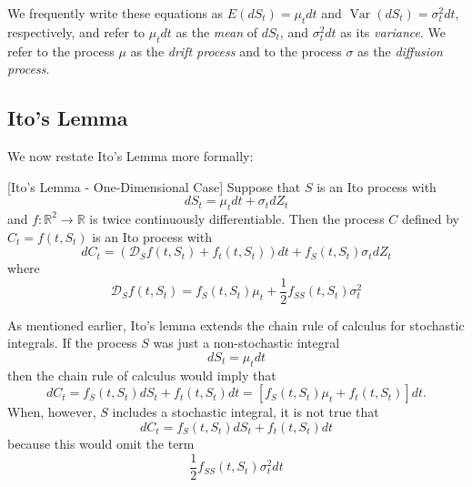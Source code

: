 \documentclass[\topdir/lecture\_notes.tex]{subfiles}
\begin{document}
We frequently write these equations as \(E(dS_{t})=\mu_{t} dt\) and \(\operatorname{Var}(dS_{t})=\sigma_{t}^{2} dt\), respectively, and refer to \(\mu_{t} dt\) as the \emph{mean} of \(dS_{t}\), and \(\sigma_{t}^{2} dt\) as its \emph{variance}. We refer to the process \(\mu\) as the \emph{drift process} and to the process \(\sigma\) as the \emph{diffusion process}.

\subsection{Ito's Lemma}
We now restate Ito's Lemma more formally:
\begin{theorem}\label{thm:ito_lemma}[Ito's Lemma - One-Dimensional Case]
Suppose that \(S\) is an Ito process with
\begin{equation*}
dS_{t}=\mu_{t} d t+\sigma_{t} dZ_{t}
\end{equation*}
and \(f: \mathbb{R}^{2} \rightarrow \mathbb{R}\) is twice continuously differentiable. Then the process \(C\) defined by \(C_{t}=f\left(t, S_{t}\right)\) is an Ito process with
\begin{equation*}
d C_{t}=\left(\mathcal{D}_{S} f\left(t, S_{t}\right)+f_{t}\left(t, S_{t}\right)\right) d t+f_{S}\left(t, S_{t}\right) \sigma_{t} d Z_{t}
\end{equation*}
where
\begin{equation*}
\mathcal{D}_{S} f\left(t, S_{t}\right)=f_{S}\left(t, S_{t}\right) \mu_{t}+\frac{1}{2} f_{S S}\left(t, S_{t}\right) \sigma_{t}^{2}
\end{equation*}
\end{theorem}
As mentioned earlier, Ito's lemma extends the chain rule of calculus for stochastic integrals. If the process \(S\) was just a non-stochastic integral
\begin{equation*}
d S_{t}=\mu_{t} dt
\end{equation*}
then the chain rule of calculus would imply that
\begin{equation*}
d C_{t}=f_{S}(t, S_{t}) d S_{t}+f_{t}(t, S_{t}) d t=[f_{S}(t, S_{t}) \mu_{t}+f_{t}(t, S_{t})] dt.
\end{equation*}
When, however, \(S\) includes a stochastic integral, it is not true that
\begin{equation*}
d C_{t}=f_{S}(t, S_{t}) d S_{t}+f_{t}(t, S_{t}) d t
\end{equation*}
because this would omit the term
\begin{equation*}
\frac{1}{2} f_{S S}\left(t, S_{t}\right) \sigma_{t}^{2} d t
\end{equation*}
\end{document}
